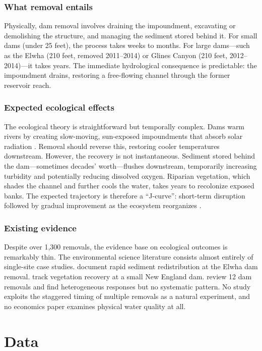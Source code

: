 \documentclass[12pt]{article}
\begin{document}
\subsubsection*{What removal entails} Physically, dam removal involves draining the impoundment, excavating or demolishing the structure, and managing the sediment stored behind it. For small dams (under 25 feet), the process takes weeks to months. For large dams---such as the Elwha (210 feet, removed 2011--2014) or Glines Canyon (210 feet, 2012--2014)---it takes years. The immediate hydrological consequence is predictable: the impoundment drains, restoring a free-flowing channel through the former reservoir reach.

\subsubsection*{Expected ecological effects} The ecological theory is straightforward but temporally complex. Dams warm rivers by creating slow-moving, sun-exposed impoundments that absorb solar radiation \citep{olden2010}. Removal should reverse this, restoring cooler temperatures downstream. However, the recovery is not instantaneous. Sediment stored behind the dam---sometimes decades' worth---flushes downstream, temporarily increasing turbidity and potentially reducing dissolved oxygen. Riparian vegetation, which shades the channel and further cools the water, takes years to recolonize exposed banks. The expected trajectory is therefore a ``J-curve'': short-term disruption followed by gradual improvement as the ecosystem reorganizes \citep{bellmore2019}.

\subsubsection*{Existing evidence} Despite over 1,300 removals, the evidence base on ecological outcomes is remarkably thin. The environmental science literature consists almost entirely of single-site case studies. \citet{major2012} document rapid sediment redistribution at the Elwha dam removal. \citet{poulos2014} track vegetation recovery at a small New England dam. \citet{tullos2016} review 12 dam removals and find heterogeneous responses but no systematic pattern. No study exploits the staggered timing of multiple removals as a natural experiment, and no economics paper examines physical water quality at all.

\section{Data}
\end{document}
